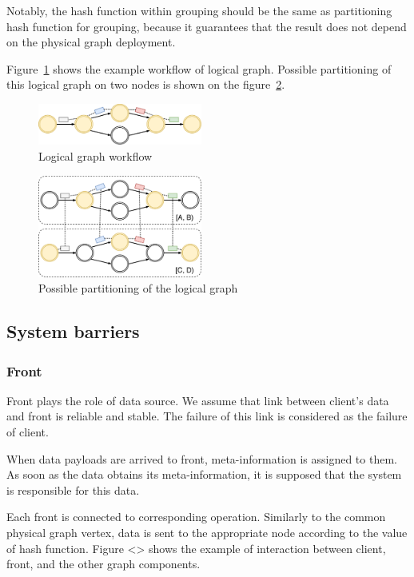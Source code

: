 Notably, the hash function within grouping should be the same as partitioning hash function for grouping, because it guarantees that the result does not depend on the physical graph deployment.

Figure~\ref{logical-graph-figure} shows the example workflow of logical graph. Possible partitioning of this logical graph on two nodes is shown on the figure~\ref{physical-graph-figure}.

\begin{figure}[htbp]
  \centering
  \includegraphics[width=0.48\textwidth]{pics/logical-graph}
  \caption{Logical graph workflow}
  \label {logical-graph-figure}
\end{figure}

\begin{figure}[htbp]
  \centering
  \includegraphics[width=0.48\textwidth]{pics/physical-graph}
  \caption{Possible partitioning of the logical graph}
  \label {physical-graph-figure}
\end{figure}

\subsection{System barriers}

\subsubsection{Front}
Front plays the role of data source. We assume that link between client’s data and front is reliable and stable. The failure of this link is considered as the failure of client.

When data payloads are arrived to front, meta-information is assigned to them. As soon as the data obtains its meta-information, it is supposed that the system is responsible for this data. 

Each front is connected to corresponding operation. Similarly to the common physical graph vertex, data is sent to the appropriate node according to the value of hash function. Figure <> shows the example of interaction between client, front, and the other graph components.

